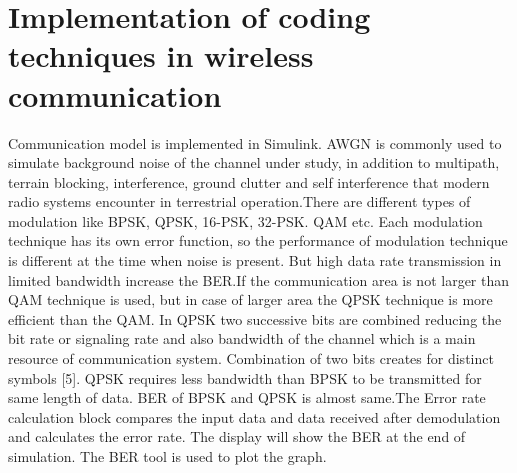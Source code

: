 \documentclass[conference]{IEEEtran}
\begin{document}
\section{Implementation of coding techniques in wireless communication}
Communication model is implemented in Simulink. AWGN is commonly used to simulate background noise of the channel under study, in addition to multipath, terrain blocking, interference, ground clutter and self interference that modern radio systems encounter in terrestrial operation.There are different types of modulation like BPSK, QPSK, 16-PSK, 32-PSK. QAM etc. Each modulation technique has its own error function, so the performance of modulation technique is different at the time when noise is present. But high data rate transmission in limited bandwidth increase the BER.If the communication area is not larger than QAM technique is used, but in case of larger area the QPSK technique is more efficient than the QAM. In QPSK two successive bits are combined reducing the bit  rate or signaling rate and also bandwidth of the channel which is a main resource of communication system. Combination of two bits creates for distinct symbols [5]. QPSK requires less bandwidth than BPSK to be transmitted for same length of
data. BER of BPSK and QPSK is almost same.The Error rate calculation block compares the input
data and data received after demodulation and calculates the error rate. The display will show the BER at the end of simulation. The  BER tool is used to plot the graph.
\end{document}
